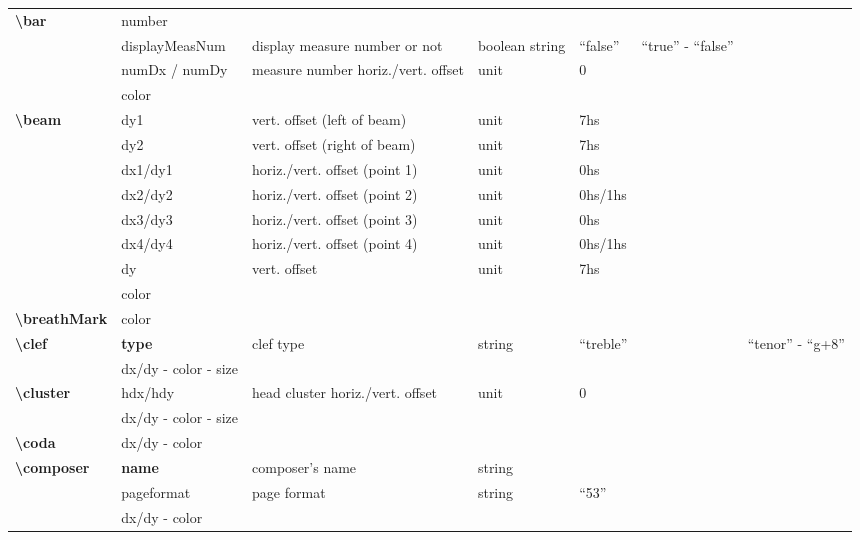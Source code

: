 \documentclass[a4paper, landscape, 10pt]{article}
\begin{document}
\begin{tabularx}{\linewidth}{p{3cm}p{3cm}p{6cm}p{2.5cm}p{2.5cm}p{3.5cm}p{3.5cm}}
    \textbf{\textbackslash{}bar}&number&&&&&\\ %
    &displayMeasNum&display measure number or not&boolean string&``false''&``true'' - ``false''&\\
    &numDx / numDy&measure number horiz./vert. offset&unit&0&&\\
    &color&&&&&\\
    \hline
    \textbf{\textbackslash{}beam}&dy1&vert. offset (left of beam)&unit&7hs&&\\
    &dy2&vert. offset (right of beam)&unit&7hs&&\\
    &dx1/dy1&horiz./vert. offset (point 1)&unit&0hs&&\\
    &dx2/dy2&horiz./vert. offset (point 2)&unit&0hs/1hs&&\\
    &dx3/dy3&horiz./vert. offset (point 3)&unit&0hs&&\\
    &dx4/dy4&horiz./vert. offset (point 4)&unit&0hs/1hs&&\\
    &dy&vert. offset&unit&7hs&&\\
    &color&&&&&\\
    \hline
    \textbf{\textbackslash{}breathMark}&color&&&&&\\
    \hline
    \textbf{\textbackslash{}clef}&\textbf{type}&clef type&string&``treble''&&``tenor'' - ``g+8''\\
    &dx/dy - color - size&&&&&\\
    \hline
    \textbf{\textbackslash{}cluster}&hdx/hdy&head cluster horiz./vert. offset&unit&0&&\\
    &dx/dy - color - size&&&&&\\
    \hline
    \textbf{\textbackslash{}coda}&dx/dy - color&&&&&\\
    \hline
    \textbf{\textbackslash{}composer}&\textbf{name}&composer's name&string&&&\\
    &pageformat&page format&string&``53''&&\\ %
    &dx/dy - color&&&&&\\
    \hline
\end{tabularx}
\end{document}
